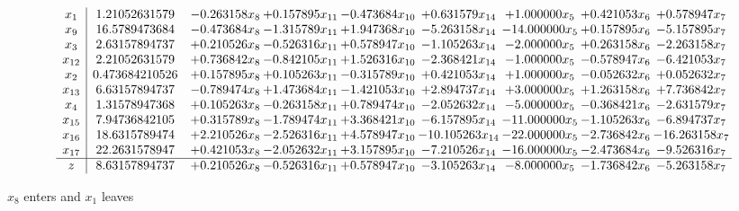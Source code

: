 \documentclass[10pt]{article}
\begin{document}
 \[\begin{array}{c| c c@{\hskip 2pt} c@{\hskip 2pt} c@{\hskip 2pt} c@{\hskip 2pt} c@{\hskip 2pt} c@{\hskip 2pt} c@{\hskip 2pt} }
 x_{1}   &  1.21052631579 & -0.263158 x_{8} & + 0.157895 x_{11} & -0.473684 x_{10} & + 0.631579 x_{14} & + 1.000000 x_{5} & + 0.421053 x_{6} & + 0.578947 x_{7}\\
 x_{9}   &  16.5789473684 & -0.473684 x_{8} & -1.315789 x_{11} & + 1.947368 x_{10} & -5.263158 x_{14} & -14.000000 x_{5} & + 0.157895 x_{6} & -5.157895 x_{7}\\
 x_{3}   &  2.63157894737 & + 0.210526 x_{8} & -0.526316 x_{11} & + 0.578947 x_{10} & -1.105263 x_{14} & -2.000000 x_{5} & + 0.263158 x_{6} & -2.263158 x_{7}\\
 x_{12}   &  2.21052631579 & + 0.736842 x_{8} & -0.842105 x_{11} & + 1.526316 x_{10} & -2.368421 x_{14} & -1.000000 x_{5} & -0.578947 x_{6} & -6.421053 x_{7}\\
 x_{2}   &  0.473684210526 & + 0.157895 x_{8} & + 0.105263 x_{11} & -0.315789 x_{10} & + 0.421053 x_{14} & + 1.000000 x_{5} & -0.052632 x_{6} & + 0.052632 x_{7}\\
 x_{13}   &  6.63157894737 & -0.789474 x_{8} & + 1.473684 x_{11} & -1.421053 x_{10} & + 2.894737 x_{14} & + 3.000000 x_{5} & + 1.263158 x_{6} & + 7.736842 x_{7}\\
 x_{4}   &  1.31578947368 & + 0.105263 x_{8} & -0.263158 x_{11} & + 0.789474 x_{10} & -2.052632 x_{14} & -5.000000 x_{5} & -0.368421 x_{6} & -2.631579 x_{7}\\
 x_{15}   &  7.94736842105 & + 0.315789 x_{8} & -1.789474 x_{11} & + 3.368421 x_{10} & -6.157895 x_{14} & -11.000000 x_{5} & -1.105263 x_{6} & -6.894737 x_{7}\\
 x_{16}   &  18.6315789474 & + 2.210526 x_{8} & -2.526316 x_{11} & + 4.578947 x_{10} & -10.105263 x_{14} & -22.000000 x_{5} & -2.736842 x_{6} & -16.263158 x_{7}\\
 x_{17}   &  22.2631578947 & + 0.421053 x_{8} & -2.052632 x_{11} & + 3.157895 x_{10} & -7.210526 x_{14} & -16.000000 x_{5} & -2.473684 x_{6} & -9.526316 x_{7}\\
\hline
z    &  8.63157894737 & + 0.210526 x_{8} & -0.526316 x_{11} & + 0.578947 x_{10} & -3.105263 x_{14} & -8.000000 x_{5} & -1.736842 x_{6} & -5.263158 x_{7}\\
\end{array}\]


 $ x_{8} $ enters and $ x_{1} $ leaves 
\end{document}
